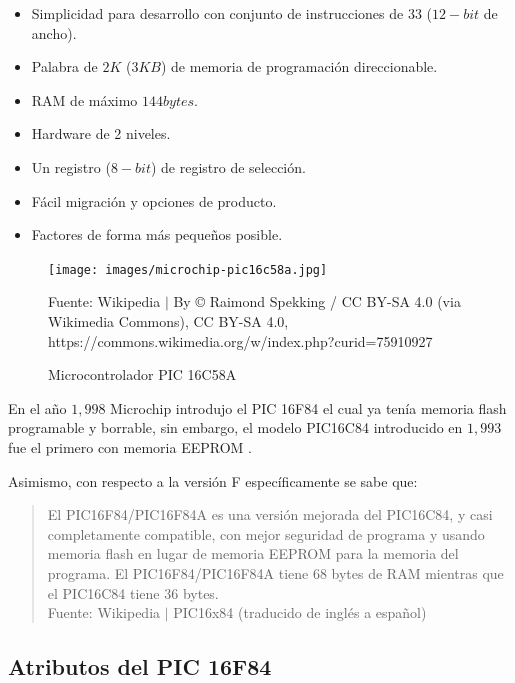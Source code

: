 \documentclass[conference]{IEEEtran}
\begin{document}
    \begin{itemize}
        \item Simplicidad para desarrollo con conjunto de instrucciones de $33$ ($12-bit$ de ancho).
        \item Palabra de $2K$ ($3KB$) de memoria de programación direccionable.
        \item RAM de máximo $144bytes$.
        \item Hardware de 2 niveles.
        \item Un registro ($8-bit$) de registro de selección.
        \item Fácil migración y opciones de producto.
        \item Factores de forma más pequeños posible.
    \end{itemize}


    \begin{figure}[H]
        \centering
        \texttt{[image: images/microchip-pic16c58a.jpg]}
        \caption{Microcontrolador PIC 16C58A} \footnotesize
        Fuente: Wikipedia $\mid$ By © Raimond Spekking / CC BY-SA 4.0 (via Wikimedia Commons), CC BY-SA 4.0, https://commons.wikimedia.org/w/index.php?curid=75910927 \cite{wikipedia-pic-2022}
    \end{figure}

    En el año $1,998$ Microchip introdujo el PIC 16F84 el cual ya tenía memoria flash programable y borrable, sin embargo, el modelo PIC16C84 introducido en $1,993$ fue el primero con memoria EEPROM \cite{wikipedia-pic-2022}.

    \bigbreak

    Asimismo, con respecto a la versión F específicamente se sabe que:

    \begin{quote}
        El PIC16F84/PIC16F84A es una versión mejorada del PIC16C84, y casi completamente compatible, con mejor seguridad de programa y usando memoria flash en lugar de memoria EEPROM para la memoria del programa. El PIC16F84/PIC16F84A tiene 68 bytes de RAM mientras que el PIC16C84 tiene 36 bytes.\\
        \small Fuente: Wikipedia $\mid$ PIC16x84 (traducido de inglés a español) \cite{wikipedia-pc16x84-2020}
    \end{quote}

    \subsection{Atributos del PIC 16F84}
\end{document}
